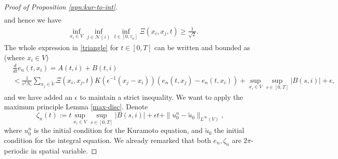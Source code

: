 \documentclass[a4paper,11pt]{amsart}
\newcommand{\red}[1]{{#1}}
\newcommand{\ep}{\epsilon}
\newcommand{\cN}{\mathcal{N}}
\numberwithin{equation}{section}
\numberwithin{theorem}{section}
\theoremstyle{definition}
\begin{document}
\begin{proof}[Proof of Proposition \ref{ppn:kur-to-int}]
\begin{align*}
\end{align*}
and hence we have
\begin{align}\label{pos-coeff}
&\inf_{x_i\in V}\inf_{j\in\cN(i)}\inf_{t\in[0,\tau_n]}\Xi(x_i,x_j, t)\ge \frac{1}{\sqrt{2}}.
\end{align}
The whole expression in \eqref{triangle} for $t\in[0,T]$ can be written and bounded as (where $x_i\in V$)
\begin{align}\label{div-form}
&\frac{d}{dt}e_n(t,x_i)=A(t,i)+B(t,i)\nonumber\\
&< \frac{1}{\ep^{2}N_i}\sum_{x_j\in\tilde V}\Xi(x_i,x_j, t)K\left(\ep^{-1}(x_j-x_i)\right)\left(e_n(t,x_j)-e_n(t,x_i)\right)+\sup_{x_i\in V}\sup_{s\in[0,T]} |B(s,i)|+\ep,
\end{align}
and we have added an $\ep$ to maintain a strict inequality. We want to apply the maximum principle Lemma \ref{max-disc}.
Denote 
\[
\zeta_{n}(t):=t\sup_{x_i\in V}\sup_{s\in[0,T]} |B(s,i)| +\ep t+ \|u^n_0 -\tilde  u_0\|_{L^\infty(V)},
\]
where $u^n_0$ is the initial condition for the Kuramoto equation, and $\tilde u_0$ the initial condition for the integral equation. \red{We already remarked that both $e_n, \zeta_n$ are $2\pi$-periodic in spatial variable.}



\end{proof}
\end{document}
